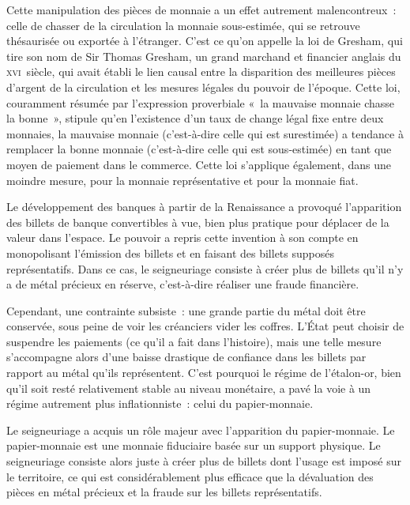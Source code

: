 Cette manipulation des pièces de monnaie a un effet autrement malencontreux~: celle de chasser de la circulation la monnaie sous-estimée, qui se retrouve thésaurisée ou exportée à l'étranger. C'est ce qu'on appelle la loi de Gresham, qui tire son nom de Sir Thomas Gresham, un grand marchand et financier anglais du \textsc{xvi}\ieme{}~siècle, qui avait établi le lien causal entre la disparition des meilleures pièces d'argent de la circulation et les mesures légales du pouvoir de l'époque. Cette loi, couramment résumée par l'expression proverbiale «~la mauvaise monnaie chasse la bonne~», stipule qu'en l'existence d'un taux de change légal fixe entre deux monnaies, la mauvaise monnaie (c'est-à-dire celle qui est surestimée) a tendance à remplacer la bonne monnaie (c'est-à-dire celle qui est sous-estimée) en tant que moyen de paiement dans le commerce. Cette loi s'applique également, dans une moindre mesure, pour la monnaie représentative et pour la monnaie fiat.


Le développement des banques à partir de la Renaissance a provoqué l'apparition des billets de banque convertibles à vue, bien plus pratique pour déplacer de la valeur dans l'espace. Le pouvoir a repris cette invention à son compte en monopolisant l'émission des billets et en faisant des billets supposés représentatifs. Dans ce cas, le seigneuriage consiste à créer plus de billets qu'il n'y a de métal précieux en réserve, c'est-à-dire réaliser une fraude financière.

Cependant, une contrainte subsiste~: une grande partie du métal doit être conservée, sous peine de voir les créanciers vider les coffres. L'État peut choisir de suspendre les paiements (ce qu'il a fait dans l'histoire), mais une telle mesure s'accompagne alors d'une baisse drastique de confiance dans les billets par rapport au métal qu'ils représentent. C'est pourquoi le régime de l'étalon-or, bien qu'il soit resté relativement stable au niveau monétaire, a pavé la voie à un régime autrement plus inflationniste~: celui du papier-monnaie.


Le seigneuriage a acquis un rôle majeur avec l'apparition du papier-monnaie. Le papier-monnaie est une monnaie fiduciaire basée sur un support physique. Le seigneuriage consiste alors juste à créer plus de billets dont l'usage est imposé sur le territoire, ce qui est considérablement plus efficace que la dévaluation des pièces en métal précieux et la fraude sur les billets représentatifs.

